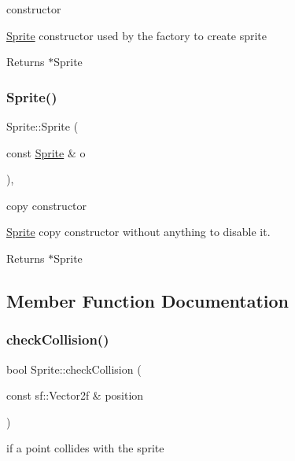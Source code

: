 constructor

\hyperlink{class_sprite}{Sprite} constructor used by the factory to create sprite

\begin{DoxyReturn}{Returns}
$\ast$\+Sprite 
\end{DoxyReturn}
\mbox{\label{class_sprite_aa5cb9fac0cfa5d81dc429e75137179d0}} 
\subsubsection{\texorpdfstring{Sprite()}{Sprite()}\hspace{0.1cm}{\footnotesize\ttfamily [2/2]}}
{\footnotesize\ttfamily Sprite\+::\+Sprite (\begin{DoxyParamCaption}\item[{const \hyperlink{class_sprite}{Sprite} \&}]{o }\end{DoxyParamCaption})\hspace{0.3cm}{\ttfamily [inline]}, {\ttfamily [protected]}}

copy constructor

\hyperlink{class_sprite}{Sprite} copy constructor without anything to disable it.

\begin{DoxyReturn}{Returns}
$\ast$\+Sprite 
\end{DoxyReturn}


\subsection{Member Function Documentation}
\mbox{\label{class_sprite_acb1a84678f2536ff83b5f2c44dfa3b45}} 
\subsubsection{\texorpdfstring{check\+Collision()}{checkCollision()}}
{\footnotesize\ttfamily bool Sprite\+::check\+Collision (\begin{DoxyParamCaption}\item[{const sf\+::\+Vector2f \&}]{position }\end{DoxyParamCaption})}

if a point collides with the sprite

